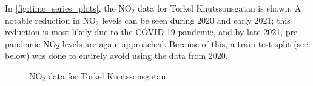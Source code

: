 In \vref{fig:time_series_plots}, the NO$_2$ data for Torkel Knutssonsgatan is shown. A notable reduction in NO$_2$ levels can be seen during 2020 and early 2021; this reduction is most likely due to the COVID-19 pandemic, and by late 2021, pre-pandemic NO$_2$ levels are again approached.  Because of this, a train-test split (see below) was done to entirely avoid using the data from 2020.


\begin{figure}[h]
\centering
{}
\caption{NO$_2$ data for Torkel Knutssonsgatan.}
\label{fig:time_series_plots}
\end{figure}


